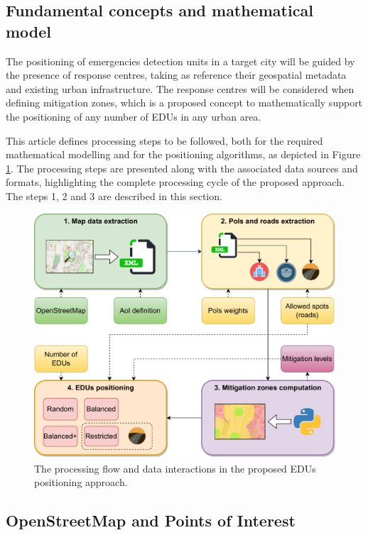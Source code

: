 \begin{refsection}
\section {Fundamental concepts and mathematical model}\label{S:3}

The positioning of emergencies detection units in a target city will be guided by the presence of response centres, taking as reference their geospatial metadata and existing urban infrastructure. The response centres will be considered when defining mitigation zones, which is a proposed concept to mathematically support the positioning of any number of EDUs in any urban area. 

This article defines processing steps to be followed, both for the required mathematical modelling and for the positioning algorithms, as depicted in Figure \ref{Fig:figFluxograma}. The processing steps are presented along with the associated data sources and formats, highlighting the complete processing cycle of the proposed approach. The steps 1, 2 and 3 are described in this section.

\begin{figure}[htb!]
  \centering
  \includegraphics[width=0.85 \linewidth]{Chapters/2-EDUs/images/flowchart.drawio.pdf}
  \caption{The processing flow and data interactions in the proposed EDUs positioning approach.}\label{Fig:figFluxograma}
\end{figure}


\subsection{OpenStreetMap and Points of Interest}


\end{refsection}
